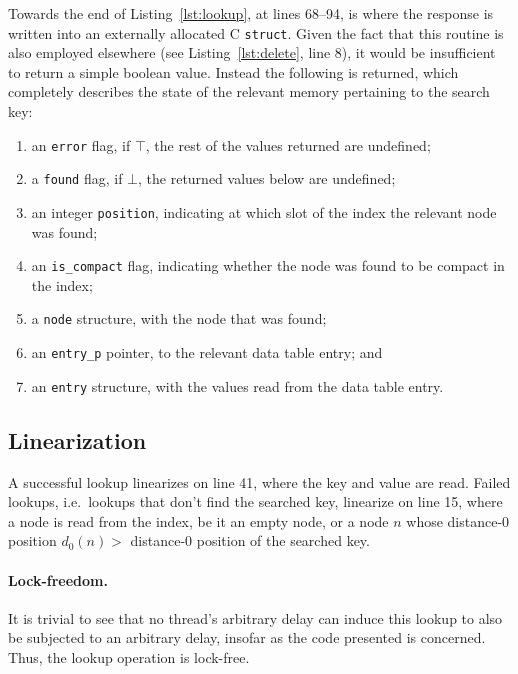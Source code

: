 Towards the end of Listing~\ref{lst:lookup}, at lines 68--94, is where the response is written into an externally allocated C \texttt{struct}.
Given the fact that this routine is also employed elsewhere (see Listing~\ref{lst:delete}, line 8), it would be insufficient to return a simple boolean value.
Instead the following is returned, which completely describes the state of the relevant memory pertaining to the search key:
\begin{enumerate}
    \item an \texttt{error} flag, if $\top$, the rest of the values returned are undefined;
    \item a \texttt{found} flag, if $\bot$, the returned values below are undefined;
    \item an integer \texttt{position}, indicating at which slot of the index the relevant node was found;
    \item an \texttt{{is\_compact}} flag, indicating whether the node was found to be compact in the index;
    \item a \texttt{node} structure, with the node that was found;
    \item an \texttt{{entry\_p}} pointer, to the relevant data table entry; and
    \item an \texttt{entry} structure, with the values read from the data table entry.
\end{enumerate}



\subsection{Linearization}\label{subsec:lookup-linearization}

A successful lookup linearizes on line 41, where the key and value are read.
Failed lookups, i.e.\ lookups that don't find the searched key, linearize on line 15, where a node is read from the index, be it an empty node, or a node $n$ whose distance-0 position $d_0(n) >$ distance-0 position of the searched key.

\paragraph{Lock-freedom.}

It is trivial to see that no thread's arbitrary delay can induce this lookup to also be subjected to an arbitrary delay, insofar as the code presented is concerned.
Thus, the lookup operation is lock-free.

